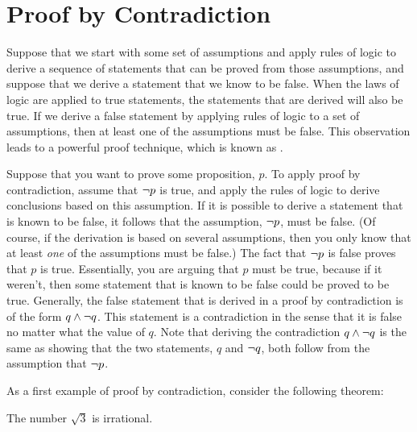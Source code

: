 \section{Proof by Contradiction}

Suppose that we start with some set of assumptions and apply rules
of logic to derive a sequence of statements that can be proved from
those assumptions, and suppose that we derive a statement that we
know to be false.  When the laws of logic are applied to true
statements, the statements that are derived will also be true.
If we derive a false statement by applying rules of logic to a set
of assumptions, then at least one of the assumptions must be false.
This observation leads to a powerful proof technique, which
is known as .

Suppose that you want to prove some proposition, $p$.
To apply proof by contradiction, assume that $\lnot p$ is true,
and apply the rules of logic to derive conclusions based on this
assumption.  If it is possible to derive a statement that is known
to be false, it follows that the assumption, $\lnot p$, must be false.
(Of course, if the derivation is based on several assumptions, then you only
know that at least \emph{one} of the assumptions must be false.)
The fact that $\lnot p$ is false proves that $p$ is true.
Essentially, you are arguing that $p$ must be true, because if it 
weren't, then some statement that is known to be false could be proved to be true.
Generally, the false statement that is derived in a proof by
contradiction is of the form $q\land \lnot q$.  This statement
is a contradiction in the sense that it is false no matter what
the value of $q$.  Note that deriving the contradiction $q\land \lnot q$
is the same as showing that the two statements, $q$ and $\lnot q$, both
follow from the assumption that $\lnot p$.

As a first example of proof by contradiction, consider the
following theorem:

\begin{theorem}
The number $\sqrt{3}$ is irrational.
\end{theorem}

